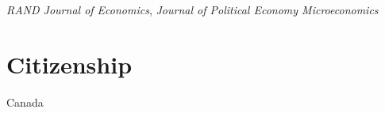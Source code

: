 \documentclass[11pt]{article} %
\begin{document}
\textit{RAND Journal of Economics}, \textit{Journal of Political Economy Microeconomics}
%
%
%


\section*{Citizenship}

Canada

%
%



\vfill %
\end{document}
